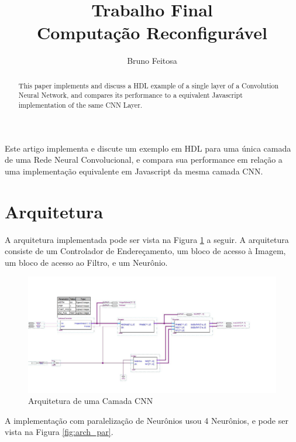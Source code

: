 \documentclass[12pt]{article}
\title{Trabalho Final \\ Computação Reconfigurável}
\author{Bruno Feitosa\inst{1}}
\begin{document}
 

\maketitle

\begin{abstract}
This paper implements and discuss a HDL example of a single layer of a
Convolution Neural Network, and compares its performance to a equivalent Javascript
implementation of the same CNN Layer.

\end{abstract}
     
\begin{resumo} 
Este artigo implementa e discute um exemplo em HDL para uma única camada de uma
Rede Neural Convolucional, e compara sua performance em relação a uma implementação equivalente
em Javascript da mesma camada CNN.

\end{resumo}

\nocite{GNU:MP,GNU:MPFR}

\section{Arquitetura}

A arquitetura implementada pode ser vista na Figura \ref{fig:arch_base} a seguir.
A arquitetura consiste de um Controlador de Endereçamento, um bloco de acesso à Imagem,
um bloco de acesso ao Filtro, e um Neurônio.\\

\begin{figure}[h]
	\centering
	\includegraphics[width=.8\textwidth]{CNN_Layer.jpg}
	\caption{Arquitetura de uma Camada CNN}
	\label{fig:arch_base}
\end{figure}

A implementação com paralelização de Neurônios usou 4 Neurônios, e pode ser vista na Figura
\ref{fig:arch_par}.\\
\end{document}
